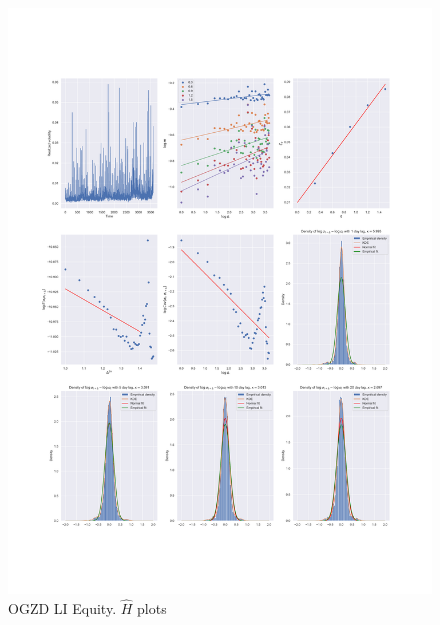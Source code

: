 \begin{figure}[h]
    \centering
    \includegraphics[width=\linewidth]{fig/OGZD LI Equity.pdf}
    \caption{OGZD LI Equity. $\hat{H}$ plots}
\end{figure} 
    
